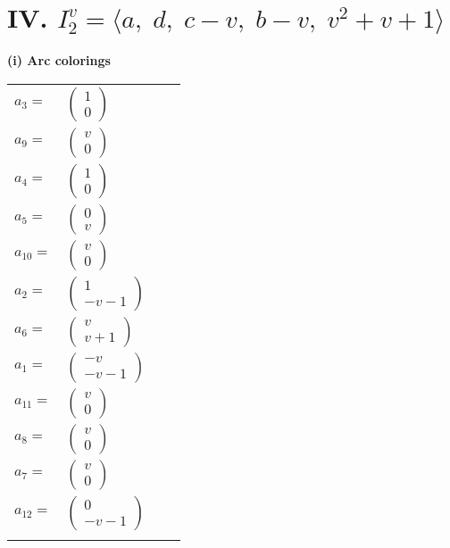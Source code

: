 \documentclass[1p]{elsarticle_modified}
\theoremstyle{definition}
\begin{document}
\centering \section*{IV. $I^v_{2}= \langle a,\;d,\;c- v,\;b- v,\;v^2+v+1 \rangle$}
\flushleft \textbf{(i) Arc colorings}\\
\begin{tabular}{m{7pt} m{180pt} m{7pt} m{180pt} }
\flushright $a_{3}=$&$\begin{pmatrix}1\\0\end{pmatrix}$ \\
\flushright $a_{9}=$&$\begin{pmatrix}v\\0\end{pmatrix}$ \\
\flushright $a_{4}=$&$\begin{pmatrix}1\\0\end{pmatrix}$ \\
\flushright $a_{5}=$&$\begin{pmatrix}0\\v\end{pmatrix}$ \\
\flushright $a_{10}=$&$\begin{pmatrix}v\\0\end{pmatrix}$ \\
\flushright $a_{2}=$&$\begin{pmatrix}1\\- v-1\end{pmatrix}$ \\
\flushright $a_{6}=$&$\begin{pmatrix}v\\v+1\end{pmatrix}$ \\
\flushright $a_{1}=$&$\begin{pmatrix}- v\\- v-1\end{pmatrix}$ \\
\flushright $a_{11}=$&$\begin{pmatrix}v\\0\end{pmatrix}$ \\
\flushright $a_{8}=$&$\begin{pmatrix}v\\0\end{pmatrix}$ \\
\flushright $a_{7}=$&$\begin{pmatrix}v\\0\end{pmatrix}$ \\
\flushright $a_{12}=$&$\begin{pmatrix}0\\- v-1\end{pmatrix}$\\&\end{tabular}
\end{document}
